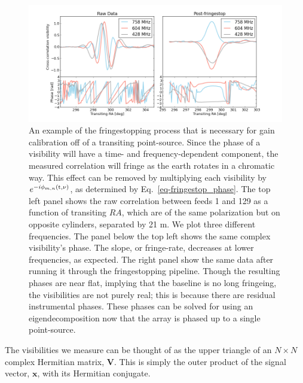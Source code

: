 \begin{figure}[!h]
\label{fig-fringestop}
\begin{center}
\vspace{1cm}
\includegraphics[trim={1in 0in 1in 1in}, width=\smwidth]{./figures/beamforming/thesis_fringestop.png}
\caption[abc]{An example of the fringestopping process that is 
 necessary for gain calibration off of a transiting point-source. Since 
 the phase of a visibility will have a time- and frequency-dependent 
 component, the measured correlation will fringe as the earth rotates in 
 a chromatic way. This effect can be removed by multiplying each visibility by 
 $e^{-i \phi_{m, n}(\rm t, \nu)}$, as determined by Eq.~\ref{eq-fringestop_phase}. 
 The top left panel shows the raw correlation between feeds 1 and 129 as a function of transiting
 $RA$, which are of the same polarization but 
 on opposite cylinders, separated by 21 m. We plot  
 three different frequencies. The panel below the top left
 shows the same complex visibility's phase. The slope, or fringe-rate, decreases 
 at lower frequencies, as expected. The right panel show the same data 
 after running it through the fringestopping pipeline. Though the resulting 
 phases are near flat, implying that the baseline is no long fringeing, 
 the visibilities are not purely real; this is because there are residual 
 instrumental phases. These phases can be solved for using an 
 eigendecomposition now that the array is phased up to a single point-source.}  
\end{center}
\end{figure}



The visibilities we measure can be thought of as 
the upper triangle of an $N\times N$ complex Hermitian 
matrix, $\mathbf{V}$. This is simply the outer product of the 
signal vector, $\mathbf{x}$, with its Hermitian conjugate. 

